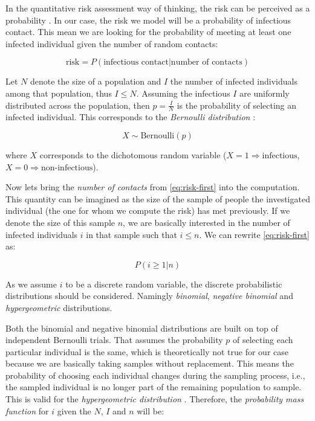 \documentclass[
  digital, %
  oneside, %
  lof,     %
  lot,     %
]{fithesis4}
\begin{document}
In the quantitative risk assessment way of thinking, the risk can be perceived as a probability \cite[Chapter~14]{bahr2014}.
In our case, the risk we model will be a probability of infectious contact.
This mean we are looking for the probability of meeting at least one infected individual given the number of random contacts:

\begin{equation}\label{eq:risk-first}
  \text{risk} = P(\text{infectious contact} | \text{number of contacts})
\end{equation}

Let $N$ denote the size of a population and $I$ the number of infected individuals among that population, thus $I \leq N$.
Assuming the infectious $I$ are uniformly distributed across the population, then $p = \frac{I}{N}$ is the probability of selecting an infected individual.
This corresponds to the \textit{Bernoulli distribution} \cite{bernoulli-dist}:

\begin{equation}
  X \sim \text{Bernoulli} \left( p \right)
\end{equation}

where $X$ corresponds to the dichotomous random variable ($X = 1 \Rightarrow \text{infectious}$, $X = 0 \Rightarrow \text{non-infectious}$).

Now lets bring the \textit{number of contacts} from \eqref{eq:risk-first} into the computation.
This quantity can be imagined as the size of the sample of people the investigated individual (the one for whom we compute the risk) has met previously.
If we denote the size of this sample $n$, we are basically interested in the number of infected individuals $i$ in that sample such that $i \leq n$. We can rewrite \eqref{eq:risk-first} as:

\begin{equation}\label{eq:risk-second}
  P(i \geq 1 | n)
\end{equation}

As we assume $i$ to be a discrete random variable, the discrete probabilistic distributions should be considered.
Namingly \textit{binomial}, \textit{negative binomial} and \textit{hypergeometric} distributions.

Both the binomial and negative binomial distributions are built on top of independent Bernoulli trials.
That assumes the probability $p$ of selecting each particular individual is the same, which is theoretically not true for our case because we are basically taking samples without replacement.
This means the probability of choosing each individual changes during the sampling process, i.e., the sampled individual is no longer part of the remaining population to sample.
This is valid for the \textit{hypergeometric distribution} \cite{hypergeometric-dist}.
Therefore, the \textit{probability mass function} for $i$ given the $N$, $I$ and $n$ will be:
\end{document}
